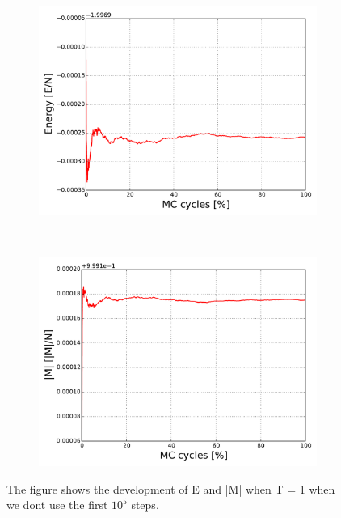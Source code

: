 \begin{figure}[H]
    \centering
    \begin{subfigure}{0.5\textwidth}
        \centering
        \includegraphics[width=\linewidth]{result/bilder/20x20/E-N20-T1-Term}
        \caption{}
    \end{subfigure}%
    ~ 
    \begin{subfigure}{0.5\textwidth}
        \centering
        \includegraphics[width=\linewidth]{result/bilder/20x20/M-N20-T1-Term}
        \caption{}
    \end{subfigure}
    \caption{The figure shows the development of E and |M| when T = 1 when we dont use the first $10^5$ steps.  }
    \label{fig:equilibrium}
\end{figure}

